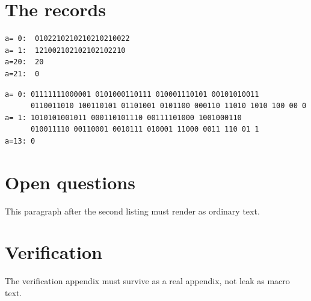 \documentclass[11pt]{amsart}
\begin{document}
\section{The records}\label{sec:records}
\begin{table}[t]
\centering
\caption{First witness.}\label{tab:T21}
\begin{lstlisting}[style=plainstyle]
a= 0:  0102210210210210210022
a= 1:  121002102102102102210
a=20:  20
a=21:  0
\end{lstlisting}
\end{table}
\begin{table}[t]
\centering
\caption{Second witness (wrapped lines).}\label{tab:T13}
\begin{lstlisting}[style=plainstyle]
a= 0: 01111111000001 0101000110111 010001110101 00101010011
      0110011010 100110101 01101001 0101100 000110 11010 1010 100 00 0
a= 1: 1010101001011 000110101110 00111101000 1001000110
      010011110 00110001 0010111 010001 11000 0011 110 01 1
a=13: 0
\end{lstlisting}
\end{table}
\section{Open questions}\label{sec:open}
This paragraph after the second listing must render as ordinary text.
\appendix
\section{Verification}\label{app:verifier}
The verification appendix must survive as a real appendix, not leak as macro text.
\end{document}
